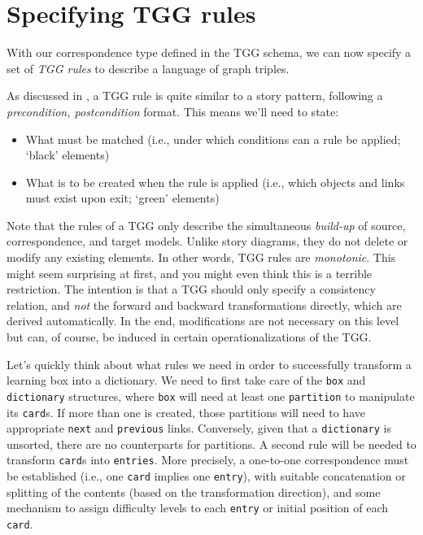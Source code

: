 \newpage
\hypertarget{sec:Rules}{}
\section{Specifying TGG rules}
\genHeader

With our correspondence type defined in the TGG schema, we can now specify a set of \emph{TGG rules} to describe a language of graph
triples.

As discussed in , a TGG rule is quite similar to a story pattern, following a \emph{precondition, postcondition}
format. This means we'll need to state:

\begin{itemize}

\item What must be matched (i.e., under which conditions can a rule be applied; `black' elements)

\item What is to be created when the rule is applied (i.e., which objects and links must exist upon exit; `green' elements)

\end{itemize}

\vspace{0.5cm}

Note that the rules of a TGG only describe the simultaneous \emph{build-up} of source, correspondence, and target models.
Unlike story diagrams, they do not delete or modify any existing elements. 
In other words, TGG rules are \emph{monotonic}.
This might seem surprising at first, and you might even think this is a terrible restriction. 
The intention is that a TGG should only specify a consistency relation, and \emph{not} the forward and backward transformations
directly, which are derived automatically. 
In the end, modifications are not necessary on this level but can, of course, be induced in certain operationalizations of the TGG.

Let's quickly think about what rules we need in order to successfully transform a learning box into a dictionary. 
We need to first take care of the \texttt{box}
and \texttt{dictionary} structures, where \texttt{box} will need at least one \texttt{partition} to manipulate its \texttt{card}s. If more than one is created, those partitions will need to have appropriate \texttt{next} and \texttt{previous} links. 
Conversely, given that a \texttt{dictionary} is unsorted, there are no
counterparts for partitions. 
A second rule will be needed to transform \texttt{card}s into \texttt{entries}.
More precisely, a one-to-one correspondence must be
established (i.e., one \texttt{card} implies one \texttt{entry}), with suitable
concatenation or splitting of the contents (based on the transformation direction), and some mechanism to assign difficulty levels to each \texttt{entry} or initial position of each \texttt{card}.






